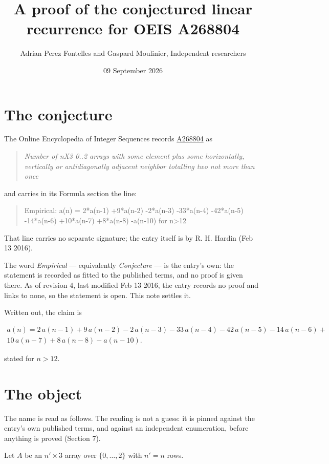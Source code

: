 \documentclass[11pt]{article}
\title{A proof of the conjectured linear recurrence for OEIS A268804}
\author{Adrian Perez Fontelles and Gaspard Moulinier, Independent researchers}
\date{09 September 2026}
\theoremstyle{definition}
\begin{document}
\maketitle
\section{The conjecture}

The Online Encyclopedia of Integer Sequences records \href{https://oeis.org/A268804}{A268804} as

\begin{quote}\itshape Number of nX3 0..2 arrays with some element plus some horizontally, vertically or antidiagonally adjacent neighbor totalling two not more than once\end{quote}

and carries in its Formula section the line:

\begin{quote}\ttfamily Empirical: a(n) = 2*a(n-1) +9*a(n-2) -2*a(n-3) -33*a(n-4) -42*a(n-5) -14*a(n-6) +10*a(n-7) +8*a(n-8) -a(n-10) for n>12\end{quote}

That line carries no separate signature; the entry itself is by R. H. Hardin (Feb 13 2016).

The word {\itshape Empirical} --- equivalently {\itshape Conjecture} --- is the entry's own: the statement is recorded as fitted to the published terms, and no proof is given there. As of revision 4, last modified Feb 13 2016, the entry records no proof and links to none, so the statement is open. This note settles it.

Written out, the claim is

\begin{multline*} a(n) = 2\,a(n-1) + 9\,a(n-2) - 2\,a(n-3) - 33\,a(n-4) - 42\,a(n-5) - 14\,a(n-6) + \\ 10\,a(n-7) + 8\,a(n-8) - a(n-10). \end{multline*}

stated for $n > 12$.

\section{The object}

The name is read as follows. The reading is not a guess: it is pinned against the entry's own published terms, and against an independent enumeration, before anything is proved (Section 7).

Let $A$ be an $n' \times 3$ array over $\{0,\dots,2\}$ with $n' = n$ rows.
\end{document}
